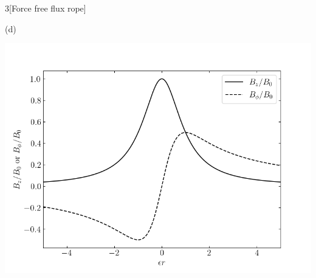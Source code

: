 \documentclass[12pt]{article}
\begin{document}
\begin{problem}{3}[Force free flux rope]
\begin{solution}
(d)
\begin{center}
    \includegraphics[width=1\textwidth]{p3.png} 
\end{center}
\end{solution}
\end{problem}
\end{document}
